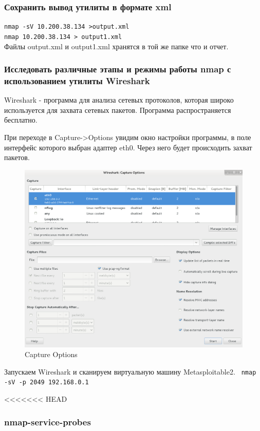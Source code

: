 \documentclass[12pt,a4paper]{article}
\begin{document}
\subsubsection{Сохранить вывод утилиты в формате xml}
\verb+nmap -sV 10.200.38.134 >output.xml+\\
\verb+nmap 10.200.38.134 > output1.xml+\\
Файлы output.xml и output1.xml хранятся в той же папке что и отчет.

\subsubsection{Исследовать различные этапы и режимы работы nmap с использованием утилиты Wireshark}
Wireshark - программа для анализа сетевых протоколов, которая широко используется для захвата сетевых пакетов. Программа распространяется бесплатно. 

При переходе в Capture->Options увидим окно настройки программы, в поле интерфейс которого выбран адаптер eth0. Через него будет происходить захват пакетов.

\FloatBarrier
\begin{figure}[h!]
\centering
\includegraphics[scale=0.5]{res/wireshark}
\caption{Capture Options}
\end{figure}
\FloatBarrier
Запускаем Wireshark и сканируем виртуальную машину Metasploitable2.
\verb+ nmap -sV -p 2049 192.168.0.1+

<<<<<<< HEAD
\subsubsection{nmap-service-probes}
\end{document}
